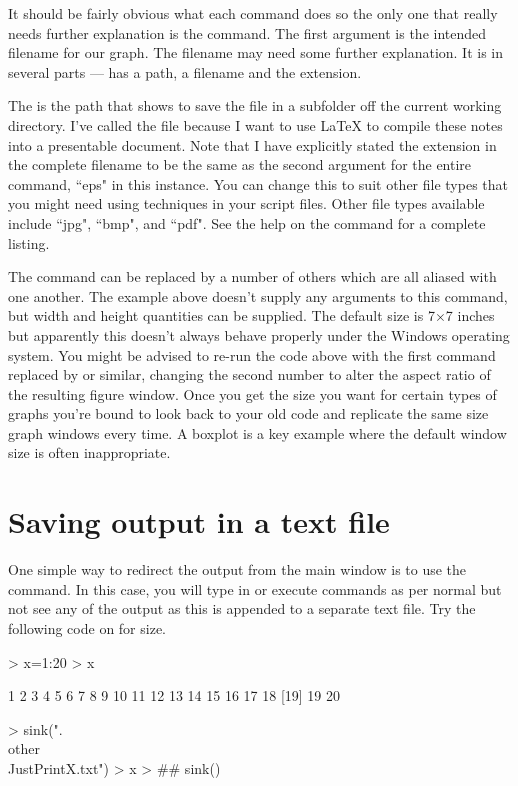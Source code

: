It should be fairly obvious what each command does so the only one that really needs further explanation is the  command. The first argument is the intended filename for our graph. The filename may need some further explanation. It is in several parts ---  has a path, a filename and the extension.

The  is the path that shows \R{} to save the file in a subfolder off the current working directory. I've called the file  because I want to use \LaTeX{} to compile these notes into a presentable document.
Note that I have explicitly stated the extension in the complete filename to be the same as the second argument for the entire command, ``eps" in this instance. You can change this to suit other file types that you might need using  techniques in your script files. Other file types available include ``jpg", ``bmp", and ``pdf". See the help on the  command for a complete listing.

The  command can be replaced by a number of others which are all aliased with one another. The example above doesn't supply any arguments to this command, but width and height quantities can be supplied. The default size is 7$\times$7 inches but apparently this doesn't always behave properly under the Windows operating system. You might be advised to re-run the code above with the first command replaced by  or similar, changing the second number to alter the aspect ratio of the resulting figure window. Once you get the size you want for certain types of graphs you're bound to look back to your old code and replicate the same size graph windows every time. A boxplot is a key example where the default window size is often inappropriate.

\section{Saving output in a text file}\label{TextSink}

One simple way to redirect the output from the main \R{} window is to use the  command. In this case, you will type in or execute commands as per normal but not see any of the output as this is appended to a separate text file. Try the following code on for size.

\begin{Schunk}
\begin{Sinput}
> x=1:20
> x
\end{Sinput}
\begin{Soutput}
 [1]  1  2  3  4  5  6  7  8  9 10 11 12 13 14 15 16 17 18
[19] 19 20
\end{Soutput}
\end{Schunk}
\begin{Schunk}
\begin{Sinput}
> sink(".\\other\\JustPrintX.txt")
> x
> ## sink()
\end{Sinput}
\end{Schunk}

